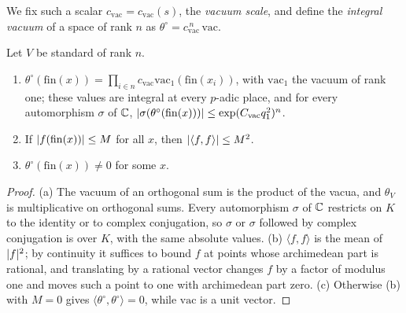 We fix such a scalar $c_{\mathrm{vac}}=c_{\mathrm{vac}}(s)$, the \emph{vacuum scale}, and define the
\emph{integral vacuum} of a space of rank $n$ as $\theta^\circ=c_{\mathrm{vac}}^{\,n}\,\mathrm{vac}$.

\begin{proposition}\label{prop:integral-vacuum}
Let $V$ be standard of rank $n$.
\begin{enumerate}[label=\textup{(\alph*)}]
\item $\theta^\circ(\mathrm{fin}(x))=\prod_{i\in n}c_{\mathrm{vac}}\mathrm{vac}_1(\mathrm{fin}(x_i))$, with
$\mathrm{vac}_1$ the vacuum of rank one; these values are integral at every $p$-adic place, and for
every automorphism $\sigma$ of $\mathbb{C}$, $\lvert \sigma(\theta^\circ(\mathrm{fin}(x)))\rvert\le\exp(C_{\mathrm{vac}}q_1^2)^n$.
\item If $\lvert f(\mathrm{fin}(x))\rvert\le M$ for all $x$, then $\lvert \langle f,f\rangle\rvert\le M^2$.
\item $\theta^\circ(\mathrm{fin}(x))\ne0$ for some $x$.
\end{enumerate}
\end{proposition}

\begin{proof}
(a) The vacuum of an orthogonal sum is the product of the vacua, and $\theta_V$ is multiplicative on
orthogonal sums. Every automorphism $\sigma$ of $\mathbb{C}$ restricts on $K$ to the identity or to complex
conjugation, so $\sigma$ or $\sigma$ followed by complex conjugation is over $K$, with the same
absolute values. (b) $\langle f,f\rangle$ is the mean of $\lvert f\rvert^2$; by continuity it suffices to bound $f$
at points whose archimedean part is rational, and translating by a rational vector changes $f$ by a
factor of modulus one and moves such a point to one with archimedean part zero. (c) Otherwise (b)
with $M=0$ gives $\langle\theta^\circ,\theta^\circ\rangle=0$, while $\mathrm{vac}$ is a unit vector.
\end{proof}

